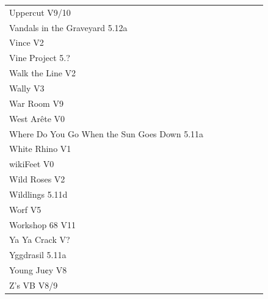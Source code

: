\begin{flushleft}
\begin{center}
\begin{supertabular}{p{0.76\linewidth}p{0.08\linewidth}}
Uppercut V9/10 & \pageref{vr:Uppercut} \\
Vandals in the Graveyard 5.12a & \pageref{rt:Vandals in the Graveyard} \\
Vince V2 & \pageref{rt:Vince} \\
Vine Project 5.? & \pageref{rt:Vine Project} \\
Walk the Line V2 & \pageref{rt:Walk the Line} \\
Wally V3 & \pageref{rt:Wally} \\
War Room V9 & \pageref{rt:War Room} \\
West Arête V0 & \pageref{rt:West Arête} \\
Where Do You Go When the Sun Goes Down 5.11a & \pageref{rt:Where Do You Go When the Sun Goes Down} \\
White Rhino V1 & \pageref{rt:White Rhino} \\
wikiFeet V0 & \pageref{rt:wikiFeet} \\
Wild Roses V2 & \pageref{rt:Wild Roses} \\
Wildlings 5.11d & \pageref{rt:Wildlings} \\
Worf V5 & \pageref{rt:Worf} \\
Workshop 68 V11 & \pageref{vr:Workshop 68} \\
Ya Ya Crack V? & \pageref{rt:Ya Ya Crack} \\
Yggdrasil 5.11a & \pageref{rt:Yggdrasil} \\
Young Ju¢y V8 & \pageref{rt:Young Ju¢y} \\
Z's VB V8/9 & \pageref{vr:Z's VB} \\
\end{supertabular}
\end{center}
\needspace{1.5cm}

\end{flushleft}
